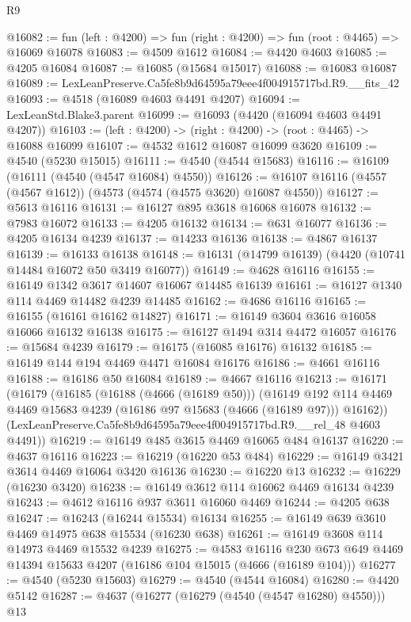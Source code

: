 \begin{lexlean}{R9}
\begin{coremodule}
@16082 := fun (left : @4200) => fun (right : @4200) => fun (root : @4465) => @16069 @16078
@16083 := @4509 @1612
@16084 := @4420 @4603
@16085 := @4205 @16084
@16087 := @16085 (@15684 @15017)
@16088 := @16083 @16087
@16089 := LexLeanPreserve.Ca5fe8b9d64595a79eee4f004915717bd.R9.__fits_42
@16093 := @4518 (@16089 @4603 @4491 @4207)
@16094 := LexLeanStd.Blake3.parent
@16099 := @16093 (@4420 (@16094 @4603 @4491 @4207))
@16103 := (left : @4200) -> (right : @4200) -> (root : @4465) -> @16088 @16099
@16107 := @4532 @1612 @16087 @16099 @3620
@16109 := @4540 (@5230 @15015)
@16111 := @4540 (@4544 @15683)
@16116 := @16109 (@16111 (@4540 (@4547 @16084) @4550))
@16126 := @16107 @16116 (@4557 (@4567 @1612)) (@4573 (@4574 (@4575 @3620) @16087 @4550))
@16127 := @5613 @16116
@16131 := @16127 @895 @3618 @16068 @16078
@16132 := @7983 @16072
@16133 := @4205 @16132
@16134 := @631 @16077
@16136 := @4205 @16134 @4239
@16137 := @14233 @16136
@16138 := @4867 @16137
@16139 := @16133 @16138
@16148 := @16131 (@14799 @16139) (@4420 (@10741 @14484 @16072 @50 @3419 @16077))
@16149 := @4628 @16116
@16155 := @16149 @1342 @3617 @14607 @16067 @14485 @16139
@16161 := @16127 @1340 @114 @4469 @14482 @4239 @14485
@16162 := @4686 @16116
@16165 := @16155 (@16161 @16162 @14827)
@16171 := @16149 @3604 @3616 @16058 @16066 @16132 @16138
@16175 := @16127 @1494 @314 @4472 @16057
@16176 := @15684 @4239
@16179 := @16175 (@16085 @16176) @16132
@16185 := @16149 @144 @194 @4469 @4471 @16084 @16176
@16186 := @4661 @16116
@16188 := @16186 @50 @16084
@16189 := @4667 @16116
@16213 := @16171
    (@16179
      (@16185
        (@16188 (@4666 (@16189 @50)))
        (@16149 @192 @114 @4469 @4469 @15683 @4239 (@16186 @97 @15683 (@4666 (@16189 @97))) @16162))
      (LexLeanPreserve.Ca5fe8b9d64595a79eee4f004915717bd.R9.__rel_48 @4603 @4491))
@16219 := @16149 @485 @3615 @4469 @16065 @484 @16137
@16220 := @4637 @16116
@16223 := @16219 (@16220 @53 @484)
@16229 := @16149 @3421 @3614 @4469 @16064 @3420 @16136
@16230 := @16220 @13
@16232 := @16229 (@16230 @3420)
@16238 := @16149 @3612 @114 @16062 @4469 @16134 @4239
@16243 := @4612 @16116 @937 @3611 @16060 @4469
@16244 := @4205 @638
@16247 := @16243 (@16244 @15534) @16134
@16255 := @16149 @639 @3610 @4469 @14975 @638 @15534 (@16230 @638)
@16261 := @16149 @3608 @114 @14973 @4469 @15532 @4239
@16275 := @4583
    @16116
    @230
    @673
    @649
    @4469
    @14394
    @15633
    @4207
    (@16186 @104 @15015 (@4666 (@16189 @104)))
@16277 := @4540 (@5230 @15603)
@16279 := @4540 (@4544 @16084)
@16280 := @4420 @5142
@16287 := @4637 (@16277 (@16279 (@4540 (@4547 @16280) @4550))) @13

\end{coremodule}
\end{lexlean}
